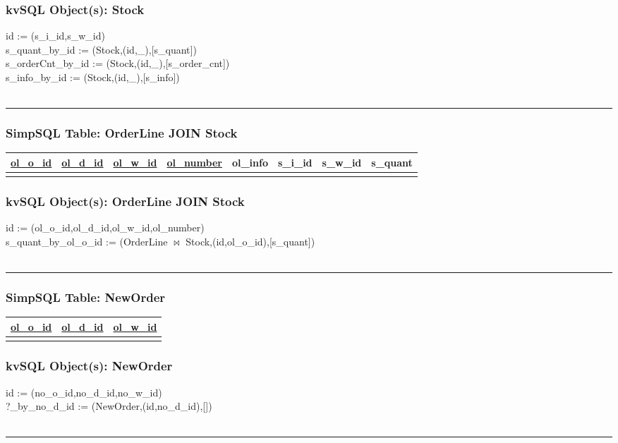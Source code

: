 \documentclass[12pt,letter]{article}
\begin{document}
\subsubsection*{kvSQL Object(s): Stock}  
id := (s\_i\_id,s\_w\_id) \\
s\_quant\_by\_id :=
(Stock,(id,\_),[s\_quant]) \\
s\_orderCnt\_by\_id :=
(Stock,(id,\_),[s\_order\_cnt]) \\
s\_info\_by\_id :=
(Stock,(id,\_),[s\_info]) \\
\\ 
\hrule


\subsubsection*{SimpSQL Table: OrderLine JOIN Stock}
\begin{tabular}{ |c|c|c|c|c|c|c|c| }
 \hline
 \underline{ol\_o\_id} & \underline{ol\_d\_id} & \underline{ol\_w\_id} &
 \underline{ol\_number} & ol\_info &s\_i\_id & s\_w\_id & s\_quant \\
 \hline
 &   &   & & & & &\\
 \hline
\end{tabular}

\subsubsection*{kvSQL Object(s): OrderLine JOIN Stock}  
id := (ol\_o\_id,ol\_d\_id,ol\_w\_id,ol\_number) \\
s\_quant\_by\_ol\_o\_id :=
(OrderLine $\bowtie$ Stock,(id,ol\_o\_id),[s\_quant]) \\
\\ 
\hrule


\subsubsection*{SimpSQL Table: NewOrder}
\begin{tabular}{ |c|c|c| }
 \hline
 \underline{ol\_o\_id} & \underline{ol\_d\_id} & \underline{ol\_w\_id}\\
 \hline
 &   &  \\
 \hline
\end{tabular}

\subsubsection*{kvSQL Object(s): NewOrder}  
id := (no\_o\_id,no\_d\_id,no\_w\_id) \\
?\_by\_no\_d\_id :=
(NewOrder,(id,no\_d\_id),[]) \\
\\ 
\hrule
\end{document}
